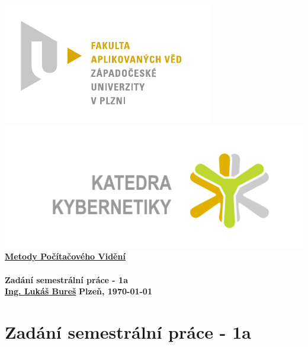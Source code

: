 \documentclass[12pt, a4paper]{article}
\newcommand{\cisloZadani}{Zadání semestrální práce - 1a}
\begin{document}
 









 
\begin{titlepage}
\begin{center}
	\includegraphics[trim = 0.6cm 0.5cm 0.9cm 0.5cm, scale=1]{./FAV_logo_cz.pdf}
	\hspace*{\fill}
	\includegraphics[trim = 3.5cm 1.5cm 2.6cm 2cm, scale=0.295]{./KKY_logo_cz.pdf}\\
	\vspace*{\fill}
	\textbf{\Huge{\href{http://www.kky.zcu.cz/cs/courses/mpv}{Metody Počítačového Vidění} \\ ~ \\ \cisloZadani}}\\
	\vspace*{\fill}
	\textbf{\large{\href{mailto:LBures@kky.zcu.cz}{Ing. Lukáš Bureš}}} \hfill \textbf{\large{Plzeň, \today}}
\end{center}
\end{titlepage}




\section*{\cisloZadani}
\end{document}

